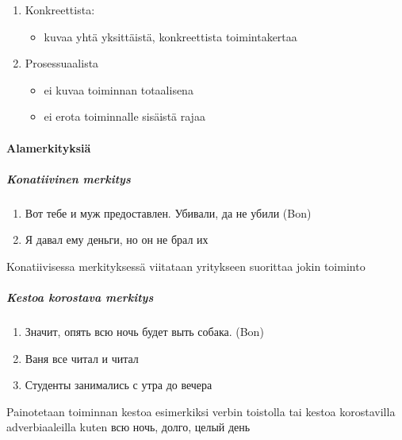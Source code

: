 \documentclass[finnish,russian,]{article}
\begin{document}
\begin{enumerate}
\def\labelenumi{\arabic{enumi}.}
\itemsep1pt\parskip0pt
\item
  Konkreettista:

  \begin{itemize}
  \itemsep1pt\parskip0pt
  \item
    kuvaa yhtä yksittäistä, konkreettista toimintakertaa\\
  \end{itemize}
\item
  Prosessuaalista

  \begin{itemize}
  \itemsep1pt\parskip0pt
  \item
    ei kuvaa toiminnan totaalisena
  \item
    ei erota toiminnalle sisäistä rajaa
  \end{itemize}
\end{enumerate}

\paragraph{Alamerkityksiä}\label{alamerkityksiuxe4}

\subparagraph{Konatiivinen merkitys}\label{konatiivinen-merkitys}

\begin{enumerate}
\def\labelenumi{(\arabic{enumi})}
\setcounter{enumi}{10}
\itemsep1pt\parskip0pt
\item
  Вот тебе и муж предоставлен. Убивали, да не убили (Bon)
\item
  Я давал ему деньги, но он не брал их
\end{enumerate}

Konatiivisessa merkityksessä viitataan yritykseen suorittaa jokin
toiminto

\subparagraph{Kestoa korostava
merkitys}\label{kestoa-korostava-merkitys}

\begin{enumerate}
\def\labelenumi{(\arabic{enumi})}
\setcounter{enumi}{12}
\itemsep1pt\parskip0pt
\item
  Значит, опять всю ночь будет выть собака. (Bon)
\item
  Ваня все читал и читал
\item
  Студенты занимались с утра до вечера
\end{enumerate}

Painotetaan toiminnan kestoa esimerkiksi verbin toistolla tai kestoa
korostavilla adverbiaaleilla kuten всю ночь, долго, целый день
\end{document}
